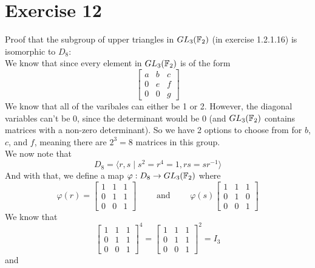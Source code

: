 \documentclass[12pt]{article}
\begin{document}
    \section*{Exercise 12}
    Proof that the subgroup of upper triangles in $GL_3(\mathbb{F}_2)$
    (in exercise 1.2.1.16) is isomorphic to $D_8$: \\
    We know that since every element in $GL_3(\mathbb{F}_2)$
    is of the form
    \[ \begin{bmatrix} a & b & c \\
        0 & e & f \\
        0 & 0 & g \end{bmatrix} \]
    We know that all of the varibales can either be 1 or 2.
    However, the diagonal variables can't be 0,
    since the determinant would be 0
    (and $GL_3(\mathbb{F}_2)$ contains matrices with a non-zero determinant).
    So we have 2 options to choose from for $b$, $c$, and $f$,
    meaning there are $2^3 = 8$ matrices in this group. \\
    We now note that 
    \[ D_{8} = \langle r, s \mid s^2 = r^4 = 1, rs = sr^{-1} \rangle \]
    And with that, we define a map
    $\varphi: D_8 \to GL_3(\mathbb{F}_2)$
    where
    \[ \varphi(r) = \begin{bmatrix} 1 & 1 & 1 \\
        0 & 1 & 1 \\
        0 & 0 & 1 \end{bmatrix} \qquad
        \text{ and } \qquad
    \varphi(s) \begin{bmatrix} 1 & 1 & 1 \\
        0 & 1 & 0 \\
        0 & 0 & 1 \end{bmatrix} \]
    We know that
    \[ \begin{bmatrix} 1 & 1 & 1 \\
        0 & 1 & 1 \\
        0 & 0 & 1 \end{bmatrix}^4
    = \begin{bmatrix} 1 & 1 & 1 \\
        0 & 1 & 1 \\
        0 & 0 & 1 \end{bmatrix}^2 = I_3 \] 
    and
\end{document}
